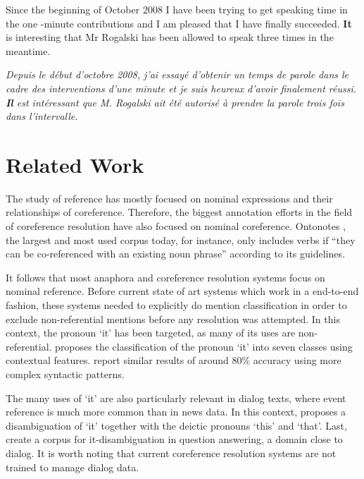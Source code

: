 \documentclass[10pt, a4paper]{article} \usepackage{lrec} \usepackage{multibib}
\begin{document}
\begin{enumerate}
Since the beginning of October 2008 I have been trying to get speaking time in
the one -minute contributions and I am pleased that I have finally succeeded.
\textbf{It} is interesting that Mr Rogalski has been allowed to speak three times in the meantime. 


\textit{Depuis le début d'octobre 2008, j'ai essayé d'obtenir un temps de parole
dans le cadre des interventions d'une minute et je suis heureux d'avoir
finalement réussi. \textbf{Il} est intéressant que M. Rogalski ait été autorisé à prendre la parole trois fois dans l'intervalle.}





\end{enumerate}



\section{Related Work}

The study of reference has mostly focused on nominal expressions and their
relationships of coreference. Therefore, the biggest annotation efforts in the
field of coreference resolution have also focused on nominal coreference.
Ontonotes \cite{pradhan-xue-2009-ontonotes}, the largest and most used corpus today, 
for instance, only includes verbs if ``they can be co-referenced with an
existing noun phrase'' according to its guidelines.

%
% 
It follows that most anaphora and coreference resolution systems focus on
nominal reference. Before current state of art systems which work in a
end-to-end fashion, these systems needed to explicitly do mention classification
in order to exclude non-referential mentions before any resolution was attempted.
In this context, the pronoun `it' has been targeted, as many of its uses are
non-referential. \cite{Evans2001} proposes the classification of the pronoun `it' into seven
classes using contextual features. \cite{Boyd2005} report similar results of
around 80\% accuracy using more complex syntactic patterns.

The many uses of `it' are also particularly relevant in dialog texts, where event reference is much more common than in news data. In this context, \cite{muller-2007-resolving} proposes a disambiguation of `it' together with the deictic pronouns `this' and `that'.  Last, \cite{Lee2016} create a corpus for it-disambiguation in question answering, a domain close to dialog. It is worth noting that current coreference resolution systems are not trained to manage dialog data.
\end{document}
